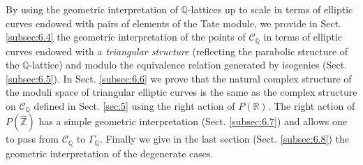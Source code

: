\documentclass[graybox, envcountsect%
]{svmult}
\def\Q{{\mathbb Q}}
\def\R{{\mathbb R}}
\def\Z{{\mathbb Z}}
\def\cC{{\mathcal C}}
\def\gaq{{\Gamma_\Q}}
\def\caq{{\cC_\Q}}
\begin{document}
By using the geometric interpretation of $\Q$-lattices up to scale in terms of elliptic curves endowed with pairs of elements of the Tate module, we provide in  Sect.  \ref{subsec:6.4}  the geometric interpretation of the points of  $\caq$ in terms of elliptic curves endowed with a \emph{triangular structure} (reflecting the parabolic structure of the $\Q$-lattice) and modulo the equivalence relation generated by isogenies  (Sect.  \ref{subsec:6.5}). 
In Sect.  \ref{subsec:6.6} we prove that the natural complex structure of the moduli space of triangular elliptic curves is the same as the complex structure on $\caq$ defined in Sect.  \ref{sec:5} using the right action of $P(\R)$. The right action of $P(\hat \Z)$ has a simple geometric interpretation (Sect.  \ref{subsec:6.7}) and allows one to pass from $\caq$ to $\gaq$. Finally we give in the last section (Sect.  \ref{subsec:6.8}) the geometric interpretation of the degenerate cases. 
\vspace{0.05in}
 
\end{document}
